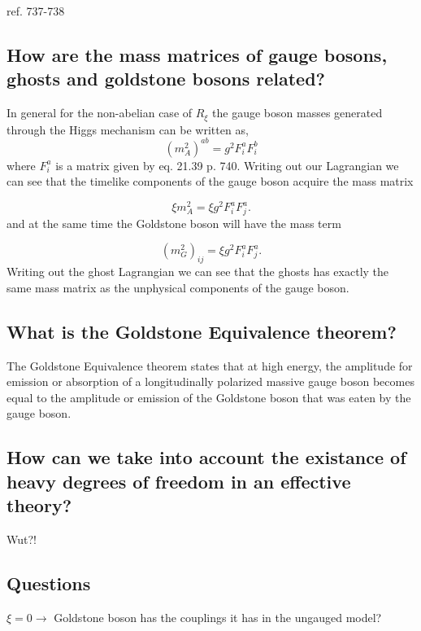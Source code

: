 \documentclass[paper=a4, fontsize=11pt]{scrartcl} %
\numberwithin{equation}{section} %
\numberwithin{figure}{section} %
\numberwithin{table}{section} %
\newcommand{\parentheses}[1]{\ensuremath{\left( #1 \right)}}
\begin{document}
ref. 737-738

\subsection{How are the mass matrices of gauge bosons, ghosts and goldstone bosons related?}

In general for the non-abelian case of $R_{\xi}$ the gauge boson masses generated through the Higgs mechanism can be written as,
\begin{equation}
 \parentheses{m_A^2}^{ab} = g^2 F_{i}^a F_{i}^b
\end{equation}
where $F_{i}^a$ is a matrix given by eq. 21.39 p. 740. Writing out our Lagrangian we can see that the timelike components of the gauge boson acquire the mass matrix

\begin{equation}
\xi m_A^2 = \xi g^2 F_i^a F_j^a.
\end{equation}
and at the same time the Goldstone boson will have the mass term

\begin{equation}
\parentheses{m_G^2}_{ij} = \xi g^2 F_i^a F_j^a.
\end{equation}
Writing out the ghost Lagrangian we can see that the ghosts has exactly the same mass matrix as the unphysical components of the gauge boson.

\subsection{What is the Goldstone Equivalence theorem?}
The Goldstone Equivalence theorem states that at high energy, the amplitude for emission or absorption of a longitudinally polarized massive gauge boson becomes equal to the amplitude or emission of the Goldstone boson that was eaten by the gauge boson. 


\subsection{How can we take into account the existance of heavy degrees of freedom in an effective theory?}
Wut?!

\subsection{Questions}
$\xi=0 \rightarrow$ Goldstone boson has the couplings it has in the ungauged model?
\end{document}
